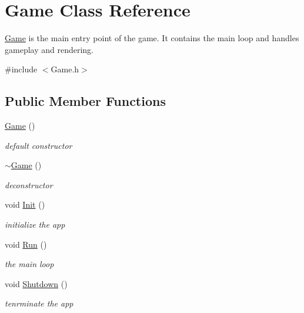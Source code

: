 \hypertarget{class_game}{\section{Game Class Reference}
\label{class_game}
}


\hyperlink{class_game}{Game} is the main entry point of the game. It contains the main loop and handles gameplay and rendering.  




{\ttfamily \#include $<$Game.\-h$>$}

\subsection*{Public Member Functions}
\begin{DoxyCompactItemize}
\item 
\hypertarget{class_game_ad59df6562a58a614fda24622d3715b65}{\hyperlink{class_game_ad59df6562a58a614fda24622d3715b65}{Game} ()}\label{class_game_ad59df6562a58a614fda24622d3715b65}

\begin{DoxyCompactList}\small\item\em default constructor \end{DoxyCompactList}\item 
\hypertarget{class_game_ae3d112ca6e0e55150d2fdbc704474530}{\hyperlink{class_game_ae3d112ca6e0e55150d2fdbc704474530}{$\sim$\-Game} ()}\label{class_game_ae3d112ca6e0e55150d2fdbc704474530}

\begin{DoxyCompactList}\small\item\em deconstructor \end{DoxyCompactList}\item 
\hypertarget{class_game_a555a9e4719fd49971765a2ab8b090b5c}{void \hyperlink{class_game_a555a9e4719fd49971765a2ab8b090b5c}{Init} ()}\label{class_game_a555a9e4719fd49971765a2ab8b090b5c}

\begin{DoxyCompactList}\small\item\em initialize the app \end{DoxyCompactList}\item 
\hypertarget{class_game_a96341ca5b54d90adc3ecb3bf0bcd2312}{void \hyperlink{class_game_a96341ca5b54d90adc3ecb3bf0bcd2312}{Run} ()}\label{class_game_a96341ca5b54d90adc3ecb3bf0bcd2312}

\begin{DoxyCompactList}\small\item\em the main loop \end{DoxyCompactList}\item 
\hypertarget{class_game_ad3b88fb61f44dbaaf88881cd77590958}{void \hyperlink{class_game_ad3b88fb61f44dbaaf88881cd77590958}{Shutdown} ()}\label{class_game_ad3b88fb61f44dbaaf88881cd77590958}

\begin{DoxyCompactList}\small\item\em tenrminate the app \end{DoxyCompactList}\end{DoxyCompactItemize}
